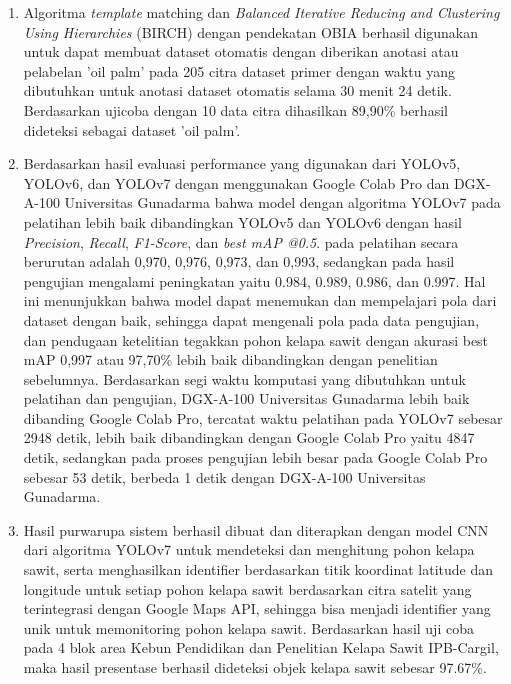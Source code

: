 \begin{enumerate}
	\item Algoritma \textit{template} matching dan \textit{Balanced Iterative Reducing and Clustering Using Hierarchies} (BIRCH) dengan pendekatan OBIA berhasil digunakan untuk dapat membuat dataset otomatis dengan diberikan anotasi atau pelabelan 'oil palm' pada 205 citra dataset primer dengan waktu yang dibutuhkan untuk anotasi dataset otomatis selama 30 menit 24 detik. Berdasarkan ujicoba dengan 10 data citra dihasilkan 89,90\% berhasil dideteksi sebagai dataset 'oil palm'.
	
	\item Berdasarkan hasil evaluasi performance yang digunakan dari YOLOv5, YOLOv6, dan YOLOv7 dengan menggunakan Google Colab Pro dan DGX-A-100 Universitas Gunadarma bahwa model dengan algoritma YOLOv7 pada pelatihan lebih baik dibandingkan YOLOv5 dan YOLOv6 dengan hasil \textit{Precision}, \textit{Recall}, \textit{F1-Score}, dan \textit{best mAP @0.5}. pada pelatihan secara berurutan adalah 0,970, 0,976, 0,973, dan 0,993, sedangkan pada hasil pengujian mengalami peningkatan yaitu 0.984, 0.989, 0.986, dan 0.997. Hal ini menunjukkan bahwa model dapat menemukan dan mempelajari pola dari dataset dengan baik, sehingga dapat mengenali pola pada data pengujian, dan pendugaan ketelitian tegakkan pohon kelapa sawit dengan akurasi best mAP 0,997 atau 97,70\% lebih baik dibandingkan dengan penelitian sebelumnya. Berdasarkan segi waktu komputasi yang dibutuhkan untuk pelatihan dan pengujian, DGX-A-100 Universitas Gunadarma lebih baik dibanding Google Colab Pro, tercatat waktu pelatihan pada YOLOv7 sebesar 2948 detik, lebih baik dibandingkan dengan Google Colab Pro yaitu 4847 detik, sedangkan pada proses pengujian lebih besar pada Google Colab Pro sebesar 53 detik, berbeda 1 detik dengan DGX-A-100 Universitas Gunadarma. 
	
	\item Hasil purwarupa sistem berhasil dibuat dan diterapkan dengan model CNN dari algoritma YOLOv7 untuk mendeteksi dan menghitung pohon kelapa sawit, serta menghasilkan identifier berdasarkan titik koordinat latitude dan longitude untuk setiap pohon kelapa sawit berdasarkan citra satelit yang terintegrasi dengan Google Maps API, sehingga bisa menjadi identifier yang unik untuk memonitoring pohon kelapa sawit. Berdasarkan hasil uji coba pada 4 blok area Kebun Pendidikan dan Penelitian Kelapa Sawit IPB-Cargil, maka hasil presentase berhasil dideteksi objek kelapa sawit sebesar 97.67\%.
	
\end{enumerate}

